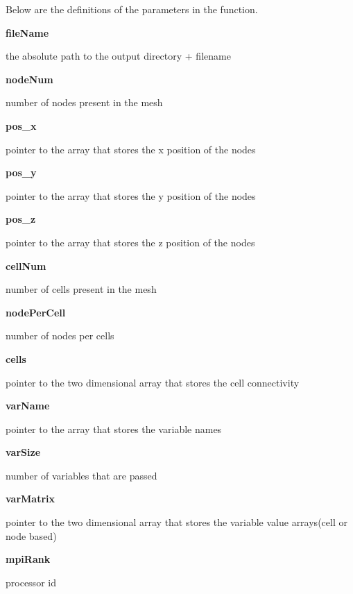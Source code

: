 \documentclass{article}
\begin{document}
        \par Below are the definitions of the parameters in the function.
\medskip

        {\bf fileName}  \par the absolute path to the output directory + filename
\medskip
        
        {\bf nodeNum} \par number of nodes present in the mesh
\medskip
        
        {\bf pos\_x} \par pointer to the array that stores the x position of the nodes
\medskip
        
        {\bf pos\_y} \par pointer to the array that stores the y position of the nodes
\medskip
        
        {\bf pos\_z} \par pointer to the array that stores the z position of the nodes
\medskip
        
        {\bf cellNum} \par number of cells present in the mesh
\medskip
        
        {\bf nodePerCell} \par number of nodes per cells 
\medskip
        
        {\bf cells} \par pointer to the two dimensional array that stores the cell connectivity
\medskip
        
        {\bf varName} \par pointer to the array that stores the variable names
\medskip
        
        {\bf varSize} \par number of variables that are passed 
\medskip
        
        {\bf varMatrix} \par pointer to the two dimensional array that stores the variable value arrays(cell or node based) 
\medskip
        
        {\bf mpiRank} \par processor id 
\end{document}
